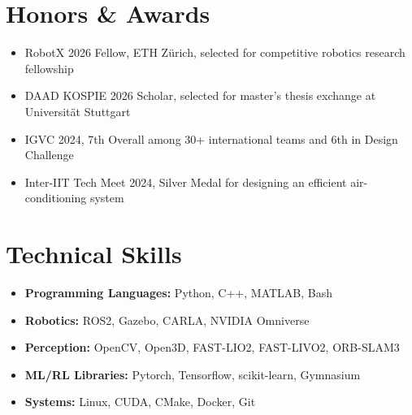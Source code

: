 \documentclass[11pt,a4paper,calibri]{moderncv}        %
\begin{document}
\vspace{-15 pt}

\section{Honors \& Awards}

\begin{itemize}[leftmargin=.2in]
\setlength\itemsep{.2em}

\item RobotX 2026 Fellow, ETH Zürich, selected for competitive robotics research fellowship
\vspace{-1 pt}
\item DAAD KOSPIE 2026 Scholar, selected for master's thesis exchange at Universität Stuttgart
\vspace{-1 pt}
\item IGVC 2024, 7th Overall among 30+ international teams and 6th in Design Challenge
\vspace{-1 pt}
\item Inter-IIT Tech Meet 2024, Silver Medal for designing an efficient air-conditioning system
\vspace{-1.5 pt}

\end{itemize}
\vspace{-15 pt}

\section{Technical Skills}

\begin{itemize}[leftmargin=.2in]
\setlength\itemsep{.2em}

\item \textbf{Programming Languages:} Python, C++, MATLAB, Bash
\vspace{-1 pt}
\item \textbf{Robotics:} ROS2, Gazebo, CARLA, NVIDIA Omniverse
\vspace{-1 pt}
\item \textbf{Perception:} OpenCV, Open3D, FAST-LIO2, FAST-LIVO2, ORB-SLAM3
\vspace{-1 pt}
\item \textbf{ML/RL Libraries:} Pytorch, Tensorflow, scikit-learn, Gymnasium
\vspace{-1 pt}
\item \textbf{Systems:} Linux, CUDA, CMake, Docker, Git
\vspace{-1.5 pt}

\end{itemize}
\vspace{-15 pt}
\end{document}
